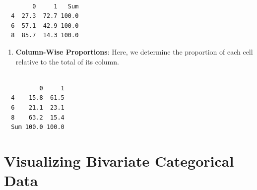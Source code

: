 \documentclass[
  letterpaper,
  DIV=11,
  numbers=noendperiod]{scrreport}
\newenvironment{Shaded}{\begin{snugshade}}{\end{snugshade}}
\newcommand{\AttributeTok}[1]{\textcolor[rgb]{0.40,0.45,0.13}{#1}}
\newcommand{\DecValTok}[1]{\textcolor[rgb]{0.68,0.00,0.00}{#1}}
\newcommand{\FunctionTok}[1]{\textcolor[rgb]{0.28,0.35,0.67}{#1}}
\newcommand{\NormalTok}[1]{\textcolor[rgb]{0.00,0.23,0.31}{#1}}
\newcommand{\SpecialCharTok}[1]{\textcolor[rgb]{0.37,0.37,0.37}{#1}}
\newcommand{\StringTok}[1]{\textcolor[rgb]{0.13,0.47,0.30}{#1}}
\providecommand{\tightlist}{%
  \setlength{\itemsep}{0pt}\setlength{\parskip}{0pt}}\usepackage{longtable,booktabs,array}
\begin{document}
\begin{verbatim}
   
        0     1   Sum
  4  27.3  72.7 100.0
  6  57.1  42.9 100.0
  8  85.7  14.3 100.0
\end{verbatim}

\begin{enumerate}
\def\labelenumi{\arabic{enumi}.}
\setcounter{enumi}{3}
\tightlist
\item
  \textbf{Column-Wise Proportions}: Here, we determine the proportion of
  each cell relative to the total of its column.
\end{enumerate}

\begin{Shaded}
\end{Shaded}

\begin{verbatim}
     
          0     1
  4    15.8  61.5
  6    21.1  23.1
  8    63.2  15.4
  Sum 100.0 100.0
\end{verbatim}

\hypertarget{visualizing-bivariate-categorical-data}{%
\section{Visualizing Bivariate Categorical
Data}\label{visualizing-bivariate-categorical-data}}
\end{document}

